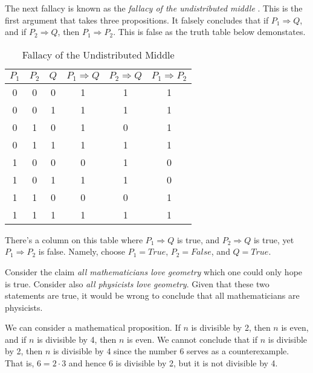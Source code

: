         The next fallacy is known as the
        \textit{fallacy of the undistributed middle}%
        . This is the first
        argument that takes three propositions. It falsely concludes that
        if $P_{1}\Rightarrow{Q}$, and if $P_{2}\Rightarrow{Q}$, then
        $P_{1}\Rightarrow{P}_{2}$. This is false as the truth table below
        demonstates.
        \begin{table}[H]
            \centering
            \captionsetup{type=table}
            \begin{tabular}{c|c|c|c|c|c}
                $P_{1}$&$P_{2}$&$Q$&$P_{1}\Rightarrow{Q}$&$P_{2}\Rightarrow{Q}$
                                   &$P_{1}\Rightarrow{P}_{2}$\\
                \hline
                0&0&0&1&1&1\\
                0&0&1&1&1&1\\
                0&1&0&1&0&1\\
                0&1&1&1&1&1\\
                1&0&0&0&1&0\\
                1&0&1&1&1&0\\
                1&1&0&0&0&1\\
                1&1&1&1&1&1
            \end{tabular}
            \caption{Fallacy of the Undistributed Middle}
            \label{tab:Fallcy_of_Undistributed_Middle}
        \end{table}
        There's a column on this table where $P_{1}\Rightarrow{Q}$ is true, and
        $P_{2}\Rightarrow{Q}$ is true, yet $P_{1}\Rightarrow{P}_{2}$ is false.
        Namely, choose $P_{1}=True$, $P_{2}=False$, and $Q=True$.
        \begin{example}
            Consider the claim \textit{all mathematicians love geometry} which
            one could only hope is true. Consider also
            \textit{all physicists love geometry}. Given that these two
            statements are true, it would be wrong to conclude that all
            mathematicians are physicists.
        \end{example}
        \begin{example}
            We can consider a mathematical proposition. If $n$ is divisible by
            2, then $n$ is even, and if $n$ is divisible by 4, then $n$ is even.
            We cannot conclude that if $n$ is divisible by 2, then $n$ is
            divisible by 4 since the number 6 serves as a counterexample. That
            is, $6=2\cdot{3}$ and hence 6 is divisible by 2, but it is not
            divisible by 4.
        \end{example}

